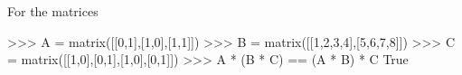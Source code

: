 \addtocounter{section}{1}

\section{}



For the matrices


\begin{consoleoutput}
    >>> A = matrix([[0,1],[1,0],[1,1]])
    >>> B = matrix([[1,2,3,4],[5,6,7,8]])
    >>> C = matrix([[1,0],[0,1],[1,0],[0,1]])
    >>> A * (B * C) == (A * B) * C
    True
\end{consoleoutput}





